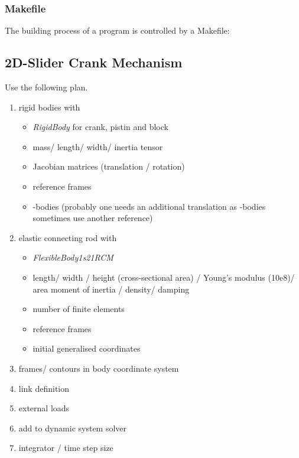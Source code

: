 
\subsubsection{Makefile} \enlargethispage{5mm}
The building process of a program is controlled by a Makefile:

\subsection{2D-Slider Crank Mechanism}
Use the following plan.
\begin{enumerate}
\item rigid bodies with
\begin{itemize}
\item \emph{RigidBody} for crank, pistin and block
\item mass/ length/ width/ inertia tensor
\item Jacobian matrices (translation / rotation)
\item reference frames
\item \OpenMBV{}-bodies (probably one needs an additional translation as \OpenMBV{}-bodies sometimes use another reference)
\end{itemize}

\item elastic connecting rod with
\begin{itemize}
\item \emph{FlexibleBody1s21RCM}
\item length/ width / height (cross-sectional area) / Young's modulus (10e8)/ area moment of inertia / density/ damping
\item number of finite elements
\item reference frames
\item initial generalised coordinates
\end{itemize}

\item frames/ contours in body coordinate system
\item link definition
\item external loads
\item add to dynamic system solver
\item integrator / time step size
\end{enumerate}

